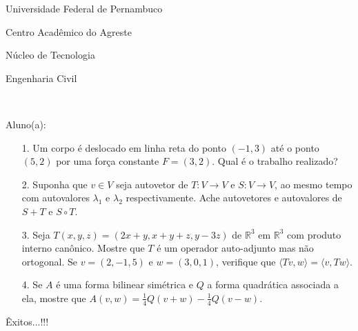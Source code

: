 \documentclass[oneside,a4paper,12pt]{article}
\newcommand{\universidade}{Universidade Federal de Pernambuco}
\newcommand{\centro}{Centro Acadêmico do Agreste}
\newcommand{\departamento}{Núcleo de Tecnologia}
\newcommand{\curso}{Engenharia Civil}
\begin{document}
	\pagestyle{empty}
	
	\begin{center}
	 	\vspace{0pt}
	 	
		\universidade
		\par
		\centro
		\par
		\departamento
		\par
		\curso
		\par
		\vspace{08pt}
		\\
	\end{center}
	
	
	\begin{flushleft}
		Aluno(a):
	\end{flushleft}
	
\begin{itemize}
\item[1.] Um corpo é deslocado em linha reta do ponto $(-1,3)$ até o ponto $(5,2)$ por uma força constante $F=(3,2)$. Qual é o trabalho realizado?
\end{itemize}
\begin{itemize}
\item[2.] Suponha que $v\in V$ seja autovetor de $T:V\longrightarrow V$ e $S:V\longrightarrow V$, ao mesmo tempo com autovalores $\lambda_{1}$ e $\lambda_{2}$ respectivamente. Ache autovetores e autovalores de $S+T$ e $S\circ T$.
 \end{itemize}
 \begin{itemize}
\item [3.] Seja $T(x,y,z)=(2x+y,x+y+z,y-3z)$ de $\mathbb{R}^{3}$ em $\mathbb{R}^{3}$ com produto interno canônico. Mostre que $T$ é um operador auto-adjunto mas não ortogonal. Se $v=(2,-1,5)$ e $w=(3,0,1)$, verifique que $\langle Tv,w \rangle=\langle v,Tw \rangle$.
\end{itemize}
\begin{itemize}
\item[4.] Se $A$ é uma forma bilinear simétrica e $Q$ a forma quadrática associada a ela, mostre que $A(v,w)=\frac{1}{4}Q(v+w)-\frac{1}{4}Q(v-w)$.
\end{itemize}

	\flushbottom
	\flushright
     Êxitos...!!!
  \vspace{12pt}
  
\end{document}

